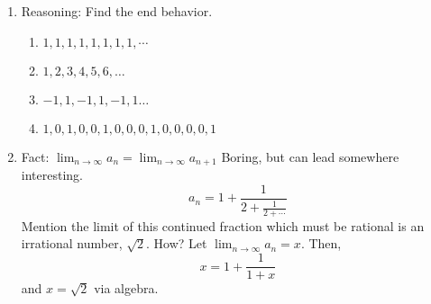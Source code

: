 \documentclass{article}
\newcommand{\ds}{\displaystyle}
\begin{document}
\begin{enumerate}
\item Reasoning: Find the end behavior.
\begin{enumerate}
\item
$
1, 1, 1, 1, 1, 1, 1, 1, \cdots
$
\item
$
1,2,3,4,5,6,\dots
$
\item
$
-1, 1, -1, 1, -1, 1\dots
$
\item
$
1,0, 1, 0, 0, 1, 0,0,0,1, 0,0,0,0,1
$
\end{enumerate}

\item Fact: $\ds
\lim_{n\rightarrow \infty} a_n = \lim_{n\rightarrow \infty} a_{n+1}
$ Boring, but can lead somewhere interesting.
$$
a_n = 1+\frac{1}{2+\frac{1}{2+\cdots}}
$$
Mention the limit of this continued fraction which must be rational is an irrational number, $\sqrt{2}$. How? Let $\lim_{n\rightarrow \infty} a_n = x$. Then,
\[
x = 1 + \frac{1}{1+x}
\]
and $x=\sqrt{2}$ via algebra. 
\end{enumerate}


\end{document}
